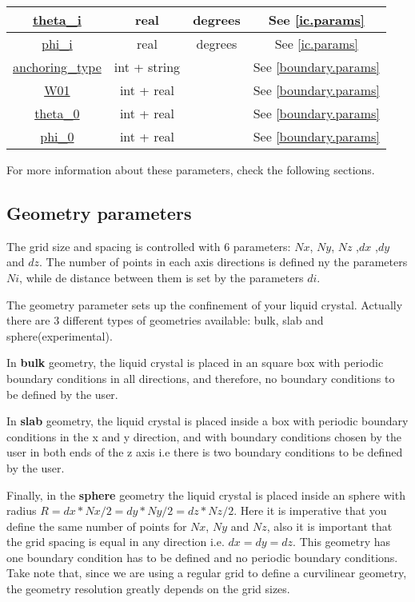 \documentclass{article}
\begin{document}
\begin{center}
\begin{longtable}{|c|c|c|c|}
          \hline 
          \hyperref[ic.param]{theta\_i} &	real & degrees & See \ref{ic.params} \\ 
          \hline 
          \hyperref[ic.param]{phi\_i} &	real & degrees  & See \ref{ic.params}\\ 
          \hline 
          \hyperref[boundary.params]{anchoring\_type} & int + string & & See \ref{boundary.params}\\ 
          \hline 
          \hyperref[boundary.params]{W01}& int + real & &  See \ref{boundary.params}  \\ 
          \hline 
          \hyperref[boundary.params]{theta\_0} &  int + real  & & See \ref{boundary.params} \\ 
          \hline 
          \hyperref[boundary.params]{phi\_0} &	 int + real  & & See \ref{boundary.params} \\ 
          \hline 
	\end{longtable} 
\end{center}

For more information about these parameters, check the following sections.


\subsection{Geometry parameters}\label{geometry}

The grid size and spacing is controlled with 6 parameters: $Nx$, $Ny$,
$Nz$ ,$dx$ ,$dy$ and $dz$. The number of points in each axis
directions is defined ny the parameters $Ni$, while de distance
between them is set by the parameters $di$.

The geometry parameter sets up the confinement of your liquid
crystal. Actually there are 3 different types of geometries available:
bulk, slab and sphere(experimental).

In \textbf{bulk} geometry, the liquid crystal is placed in an square box
with periodic boundary conditions in all directions, and therefore, no boundary conditions to be defined by the user.

In \textbf{slab} geometry, the liquid crystal is placed inside a box
with periodic boundary conditions in the x and y direction, and with
boundary conditions chosen by the user in both ends of the z
axis i.e there is two boundary conditions to be defined by the user. 

Finally, in the \textbf{sphere} geometry the liquid crystal is placed
inside an sphere with radius $R=dx*Nx/2=dy*Ny/2=dz*Nz/2$. Here it
is imperative that you define the same number of points for $Nx$, $Ny$
and $Nz$, also it is important that the grid spacing is equal in any
direction i.e. $dx=dy=dz$. This geometry has one boundary condition
has to be defined and no periodic boundary conditions. Take note that,
since we are using a regular grid to define a curvilinear geometry,
the geometry resolution greatly depends on the grid sizes.
\end{document}
